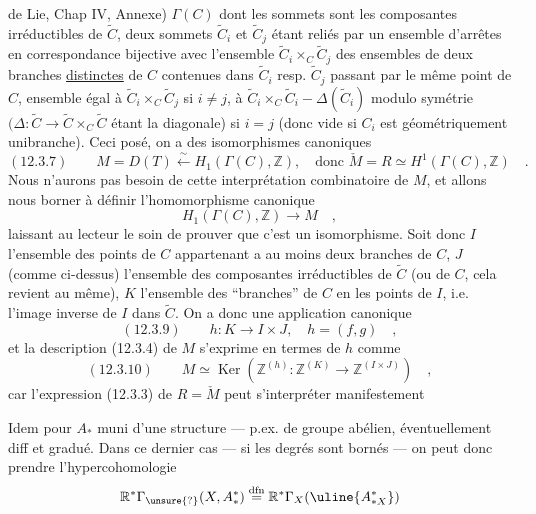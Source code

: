 de Lie, Chap IV, Annexe) $\Gamma(C)$ dont les sommets sont les composantes irréductibles de $\widetilde C$, deux sommets $\widetilde C_i$ et $\widetilde C_j$ étant reliés par un ensemble d'arrêtes en correspondance bijective avec l'ensemble $\widetilde C_i\times_C\widetilde C_j$ des ensembles de deux branches \uline{distinctes} de $C$ contenues dans $\widetilde C_i$ resp. $\widetilde C_j$ passant par le même point de $C$, ensemble égal à $\widetilde C_i\times_C\widetilde C_j$ si $i\neq j$, à $\widetilde C_i\times_C\widetilde C_i-\Delta(\widetilde C_i)$ modulo symétrie $(\Delta:\widetilde C\longrightarrow\widetilde C\times_C\widetilde C$ étant la diagonale) si $i=j$ (donc vide si $C_i$ est géométriquement unibranche). Ceci posé, on a des isomorphismes canoniques
\[
(12.3.7)\qquad M=D(T)\xleftarrow{\sim}H_1(\Gamma(C),\mathbb Z),
\quad\text{donc }\check M=R\simeq H^1(\Gamma(C),\mathbb Z)\quad.
\]
Nous n'aurons pas besoin de cette interprétation combinatoire de $M$, et allons nous borner à définir l'homomorphisme canonique
\[
H_1(\Gamma(C),\mathbb Z)\longrightarrow M\quad,
\]
laissant au lecteur le soin de prouver que c'est un isomorphisme. Soit donc $I$ l'ensemble des points de $C$ appartenant a au moins deux branches de $C$, $J$ (comme ci-dessus) l'ensemble des composantes irréductibles de $\widetilde C$ (ou de $C$, cela revient au même), $K$ l'ensemble des ``branches'' de $C$ en les points de $I$, i.e. l'image inverse de $I$ dans $\widetilde C$. On a donc une application canonique
\[
(12.3.9)\qquad h:K\longrightarrow I\times J,\quad h=(f,g)\quad,
\]
et la description (12.3.4) de $M$ s'exprime en termes de $h$ comme
\[
(12.3.10)\qquad M\simeq\operatorname{Ker}(\mathbb Z^{(h)}:\mathbb Z^{(K)}
\longrightarrow\mathbb Z^{(I\times J)})\quad,
\]
car l'expression (12.3.3) de $R=\check M$ peut s'interpréter manifestement



Idem pour $A_*$ muni d'une structure  --- p.ex. de groupe abélien, éventuellement diff et gradué. Dans ce dernier cas --- si les degrés sont bornés  --- on peut donc prendre l'hypercohomologie
\[
\mathbb R^*\Gamma_{\unsure{?}}(X,A_*^*)
\overset{\mathrm{dfn}}{=}
\mathbb R^*\Gamma_X(\uline{A_{*X}^*})
\]


